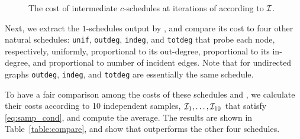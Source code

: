 \begin{figure}[htbp]
\caption{\scriptsize The cost of intermediate $c$-schedules at iterations of \algonameapx  according to $\mathcal{I}$.}\label{fig:conv}
\end{figure}







Next, we extract the $1$-schedules  output by \algonameapx, and compare its cost to four other natural schedules: \texttt{unif}, \texttt{outdeg}, \texttt{indeg}, and \texttt{totdeg} that probe each node, respectively, uniformly, proportional to its out-degree, proportional to its in-degree, and proportional to number of incident edges. Note that for undirected graphs \texttt{outdeg}, \texttt{indeg}, and \texttt{totdeg} are essentially the same schedule. 

To have a fair comparison among the costs of these schedules and \algonameapx, we calculate their costs according to 10  independent samples, $\mathcal{I}_1,\ldots,\mathcal{I}_{10}$ that satisfy \eqref{eq:samp_cond}, and compute the average. The results are shown in Table~\ref{table:compare}, and show that \algonameapx outperforms the other four schedules.



